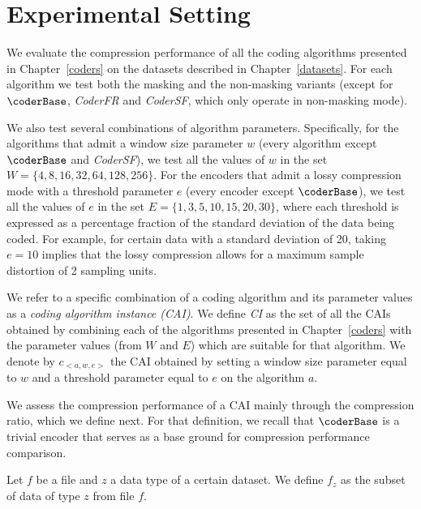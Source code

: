 
\section{Experimental Setting}
\label{experiments:experiments}


We evaluate the compression performance of all the coding algorithms presented in Chapter~\ref{coders} on the datasets described in Chapter~\ref{datasets}. For each algorithm we test both the masking and the non-masking variants (except for $\coderBase$, \textit{CoderFR} and \textit{CoderSF}, which only operate in non-masking mode).


We also test several combinations of algorithm parameters. Specifically, for the algorithms that admit a window size parameter $w$ (every algorithm except $\coderBase$ and \textit{CoderSF}), we test all the values of $w$ in the set $W = \{4, 8, 16, 32, 64, 128, 256\}$. For the encoders that admit a lossy compression mode with a threshold parameter $e$ (every encoder except $\coderBase$), we test all the values of $e$ in the set $E= \{1, 3, 5, 10, 15, 20, 30\}$, where each threshold is expressed as a percentage fraction of the standard deviation of the data being coded. For example, for certain data with a standard deviation of 20, taking $e=10$ implies that the lossy compression allows for a maximum sample distortion of 2 sampling units.


\vspace{+5pt}
\begin{defcion}
We refer to a specific combination of a coding algorithm and its parameter values as a \textit{coding algorithm instance (CAI)}. We define \textit{CI} as the set of all the CAIs obtained by combining each of the algorithms presented in Chapter~\ref{coders} with the parameter values (from $W$ and $E$) which are suitable for that algorithm. We denote by $c_{<a, w, e>}$ the CAI obtained by setting a window size parameter equal to $w$ and a threshold parameter equal to $e$ on the algorithm $a$.
\end{defcion}


We assess the compression performance of a CAI mainly through the compression ratio, which we define next. For that definition, we recall that $\coderBase$ is a trivial encoder that serves as a base ground for compression performance comparison.


\clearpage


\begin{defcion}
Let $f$ be a file and $z$ a data type of a certain dataset. We define $f_z$ as the subset of data of type $z$ from file $f$.
\end{defcion}


